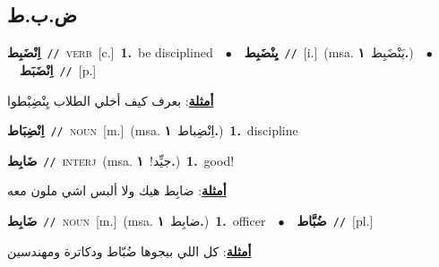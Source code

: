 \documentclass[10pt,a4paper,twoside]{article} %
\begin{document}
\begin{multicols}{2}
{{\vspace{-3mm}
\subsection*{\color{blue}\foreignlanguage{arabic}{ض.ب.ط}\color{blue}{}} 

{\setlength\topsep{0pt}\textbf{\foreignlanguage{arabic}{اِنْضَبِط}}\ {\color{gray}\texttt{//}\color{black}}\ \textsc{verb}\ [c.]\ \textbf{1.}~be disciplined\ \ $\bullet$\ \ \setlength\topsep{0pt}\textbf{\foreignlanguage{arabic}{يِنْضَبِط}}\ {\color{gray}\texttt{//}\color{black}}\ [i.]\ \color{gray}(msa. \foreignlanguage{arabic}{يَنْضَبِط}~\foreignlanguage{arabic}{\textbf{١.}})\color{black}\ \ $\bullet$\ \ \setlength\topsep{0pt}\textbf{\foreignlanguage{arabic}{اِنْضَبَط}}\ {\color{gray}\texttt{//}\color{black}}\ [p.]\  \begin{flushright}\color{gray}\foreignlanguage{arabic}{\textbf{\underline{\foreignlanguage{arabic}{أمثلة}}}: بعرف كيف أخلي الطلاب يِنْضِبْطوا}\end{flushright}\color{black}} \vspace{2mm}

{\setlength\topsep{0pt}\textbf{\foreignlanguage{arabic}{اِنْضِبَاط}}\ {\color{gray}\texttt{//}\color{black}}\ \textsc{noun}\ [m.]\ \color{gray}(msa. \foreignlanguage{arabic}{اِنْضِباط}~\foreignlanguage{arabic}{\textbf{١.}})\color{black}\ \textbf{1.}~discipline\ 

{\setlength\topsep{0pt}\textbf{\foreignlanguage{arabic}{ضَابِط}}\ {\color{gray}\texttt{//}\color{black}}\ \textsc{interj}\ \color{gray}(msa. \foreignlanguage{arabic}{جيِّد!}~\foreignlanguage{arabic}{\textbf{١.}})\color{black}\ \textbf{1.}~good!\  \begin{flushright}\color{gray}\foreignlanguage{arabic}{\textbf{\underline{\foreignlanguage{arabic}{أمثلة}}}: ضابِط هيك ولا ألبس اشي ملون معه}\end{flushright}\color{black}} \vspace{2mm}

{\setlength\topsep{0pt}\textbf{\foreignlanguage{arabic}{ضَابِط}}\ {\color{gray}\texttt{//}\color{black}}\ \textsc{noun}\ [m.]\ \color{gray}(msa. \foreignlanguage{arabic}{ضابِط}~\foreignlanguage{arabic}{\textbf{١.}})\color{black}\ \textbf{1.}~officer\ \ $\bullet$\ \ \setlength\topsep{0pt}\textbf{\foreignlanguage{arabic}{ضُبَّاط}}\ {\color{gray}\texttt{//}\color{black}}\ [pl.]\  \begin{flushright}\color{gray}\foreignlanguage{arabic}{\textbf{\underline{\foreignlanguage{arabic}{أمثلة}}}: كل اللي بيجوها ضُبّاط ودكاترة ومهندسين}\end{flushright}\color{black}} \vspace{2mm}

}}}
\end{multicols}
\end{document}
